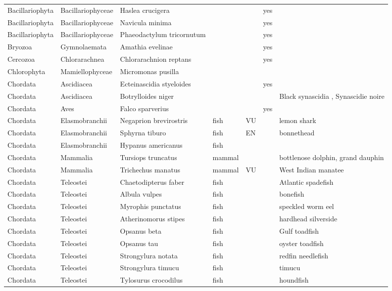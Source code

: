 \begin{longtable}{lllllll}
  Bacillariophyta & Bacillariophyceae & Haslea crucigera &  &  & yes &  \\ 
  Bacillariophyta & Bacillariophyceae & Navicula minima &  &  & yes &  \\ 
  Bacillariophyta & Bacillariophyceae & Phaeodactylum tricornutum &  &  & yes &  \\ 
  Bryozoa & Gymnolaemata & Amathia evelinae &  &  & yes &  \\ 
  Cercozoa & Chlorarachnea & Chlorarachnion reptans &  &  & yes &  \\ 
  Chlorophyta & Mamiellophyceae & Micromonas pusilla &  &  &  &  \\ 
  Chordata & Ascidiacea & Ecteinascidia styeloides &  &  & yes &  \\ 
  Chordata & Ascidiacea & Botrylloides niger &  &  &  & Black synascidia , Synascidie noire \\ 
  Chordata & Aves & Falco sparverius &  &  & yes &  \\ 
  Chordata & Elasmobranchii & Negaprion brevirostris & fish & VU &  & lemon shark \\ 
  Chordata & Elasmobranchii & Sphyrna tiburo & fish & EN &  & bonnethead \\ 
  Chordata & Elasmobranchii & Hypanus americanus & fish &  &  &  \\ 
  Chordata & Mammalia & Tursiops truncatus & mammal &  &  & bottlenose dolphin, grand dauphin \\ 
  Chordata & Mammalia & Trichechus manatus & mammal & VU &  & West Indian manatee \\ 
  Chordata & Teleostei & Chaetodipterus faber & fish &  &  & Atlantic spadefish \\ 
  Chordata & Teleostei & Albula vulpes & fish &  &  & bonefish \\ 
  Chordata & Teleostei & Myrophis punctatus & fish &  &  & speckled worm eel \\ 
  Chordata & Teleostei & Atherinomorus stipes & fish &  &  & hardhead silverside \\ 
  Chordata & Teleostei & Opsanus beta & fish &  &  & Gulf toadfish \\ 
  Chordata & Teleostei & Opsanus tau & fish &  &  & oyster toadfish \\ 
  Chordata & Teleostei & Strongylura notata & fish &  &  & redfin needlefish \\ 
  Chordata & Teleostei & Strongylura timucu & fish &  &  & timucu \\ 
  Chordata & Teleostei & Tylosurus crocodilus & fish &  &  & houndfish \\ 

\end{longtable}
